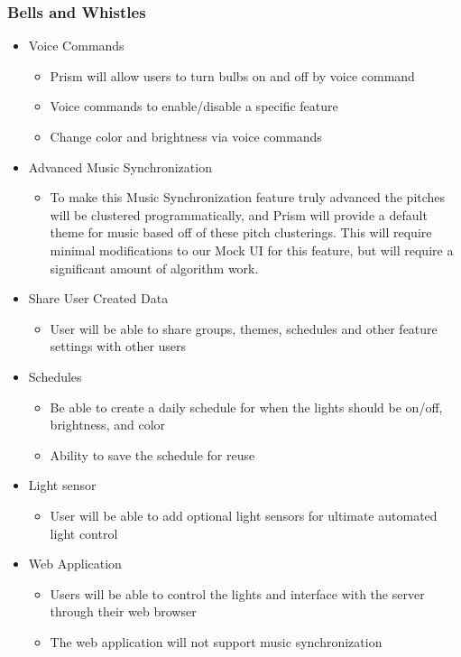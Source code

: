\documentclass[12pt]{article}
\begin{document}
\subsubsection*{Bells and Whistles}
\begin{itemize}
\item Voice Commands
\begin{itemize}
\item Prism will allow users to turn bulbs on and off by voice command
\item Voice commands to enable/disable a specific feature
\item Change color and brightness via voice commands
\end{itemize}
	
\item Advanced Music Synchronization
\begin{itemize}
\item To make this Music Synchronization feature truly advanced the pitches will be clustered programmatically, and Prism will provide a default theme for music based off of these pitch clusterings. This will require minimal modifications to our Mock UI for this feature, but will require a significant amount of algorithm work.
\end{itemize}

\item Share User Created Data
\begin{itemize}
\item User will be able to share groups, themes, schedules and other feature settings with other users
\end{itemize}

\item Schedules
\begin{itemize}
\item Be able to create a daily schedule for when the lights should be on/off, brightness, and color
\item Ability to save the schedule for reuse
\end{itemize}

\item Light sensor
\begin{itemize}
\item User will be able to add optional light sensors for ultimate automated light control
\end{itemize}

\item Web Application
\begin{itemize}
\item Users will be able to control the lights and interface with the server through their web browser
\item The web application will not support music synchronization
\end{itemize}
\end{itemize}
\end{document}
